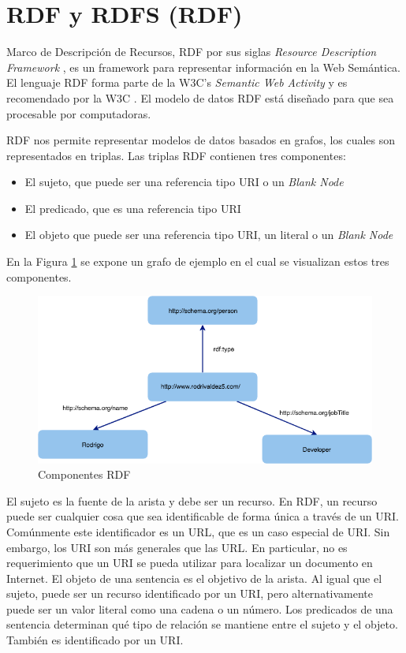 \section{RDF y RDFS (RDF)}

Marco de Descripción de Recursos, RDF por sus siglas \textit{Resource Description Framework}  \cite{rdf}, es un framework para representar información en la Web Semántica. El lenguaje RDF forma parte de la W3C's \textit{Semantic Web Activity} y es recomendado por la W3C \cite{Semantic20:online}. El modelo de datos RDF está diseñado para que sea procesable por computadoras. 

RDF nos permite representar modelos de datos basados en grafos, los cuales son representados en triplas. Las triplas RDF contienen tres componentes:

\begin{itemize}
  \item El sujeto, que puede ser una referencia tipo URI o un \textit{Blank Node}
  \item El predicado, que es una referencia tipo URI
  \item El objeto que puede ser una referencia tipo URI, un literal o un \textit{Blank Node}
\end{itemize}



En la Figura \ref{img:componentes rdf } se expone un grafo de ejemplo en el cual se visualizan estos tres componentes.

    \begin{figure}[ht!]
    \centering
    \includegraphics[width=150mm]{figuras/Diagramas-RDFGraph}
    \caption{Componentes RDF}
    \label{img:componentes rdf }
    \end{figure}
    
El sujeto es la fuente de la arista y debe ser un recurso. En RDF, un recurso puede ser cualquier cosa que sea identificable de forma única a través de un URI. Comúnmente este identificador es un URL, que es un caso especial de URI. Sin embargo, los URI son más generales que las URL. En particular, no es requerimiento que un URI se pueda utilizar para localizar un documento en Internet. El objeto de una sentencia es el objetivo de la arista. Al igual que el sujeto, puede ser un recurso identificado por un URI, pero alternativamente puede ser un valor literal como una cadena o un número. Los predicados de una sentencia determinan qué tipo de relación se mantiene entre el sujeto y el objeto. También es identificado por un URI.

